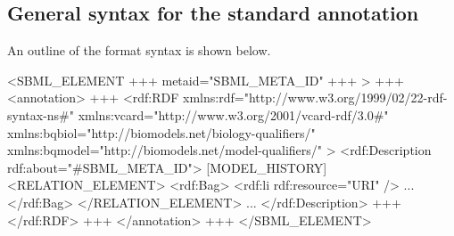 \clearpage

\subsection{General syntax for the standard annotation}

An outline of the format syntax is shown below.

\vspace*{0.1ex}

\begin{example}
<SBML_ELEMENT +++ metaid="SBML_META_ID" +++ >
  +++
  <annotation>
    +++
    <rdf:RDF
      xmlns:rdf="http://www.w3.org/1999/02/22-rdf-syntax-ns\#"
      xmlns:vcard="http://www.w3.org/2001/vcard-rdf/3.0\#"
      xmlns:bqbiol="http://biomodels.net/biology-qualifiers/"
      xmlns:bqmodel="http://biomodels.net/model-qualifiers/"
    >
      <rdf:Description rdf:about="#SBML_META_ID">
        [MODEL_HISTORY]
        <RELATION_ELEMENT>
          <rdf:Bag>
            <rdf:li rdf:resource="URI" />
            ...
          </rdf:Bag>
        </RELATION_ELEMENT>
        ...
      </rdf:Description>
      +++
    </rdf:RDF>
    +++
  </annotation>
  +++
</SBML_ELEMENT>
\end{example}

